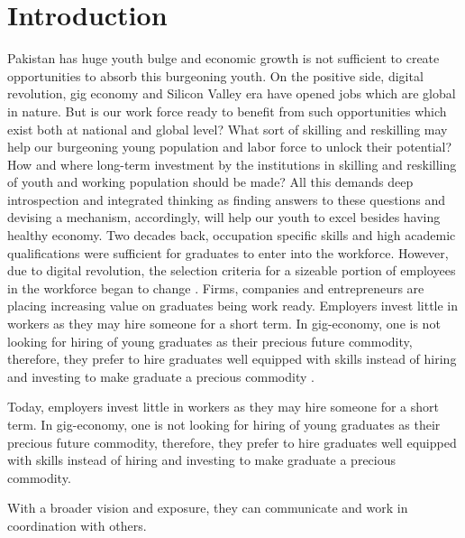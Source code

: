 \documentclass[
  12pt]{article}
\begin{document}
\newpage
{} %
\ifdefined\Shaded\renewenvironment{Shaded}{\begin{tcolorbox}[sharp corners, borderline west={3pt}{0pt}{shadecolor}, boxrule=0pt, breakable, enhanced, frame hidden, interior hidden]}{\end{tcolorbox}}\fi

\hypertarget{sec-intro}{%
\section{Introduction}\label{sec-intro}}

Pakistan has huge youth bulge and economic growth is not sufficient to
create opportunities to absorb this burgeoning youth. On the positive
side, digital revolution, gig economy and Silicon Valley era have opened
jobs which are global in nature. But is our work force ready to benefit
from such opportunities which exist both at national and global level?
What sort of skilling and reskilling may help our burgeoning young
population and labor force to unlock their potential? How and where
long-term investment by the institutions in skilling and reskilling of
youth and working population should be made? All this demands deep
introspection and integrated thinking as finding answers to these
questions and devising a mechanism, accordingly, will help our youth to
excel besides having healthy economy. Two decades back, occupation
specific skills and high academic qualifications were sufficient for
graduates to enter into the workforce. However, due to digital
revolution, the selection criteria for a sizeable portion of employees
in the workforce began to change \citet{assessme2015} . Firms, companies
and entrepreneurs are placing increasing value on graduates being work
ready. Employers invest little in workers as they may hire someone for a
short term. In gig-economy, one is not looking for hiring of young
graduates as their precious future commodity, therefore, they prefer to
hire graduates well equipped with skills instead of hiring and investing
to make graduate a precious commodity \citet{akdere2018} .

Today, employers invest little in workers as they may hire someone for a
short term. In gig-economy, one is not looking for hiring of young
graduates as their precious future commodity, therefore, they prefer to
hire graduates well equipped with skills instead of hiring and investing
to make graduate a precious commodity.

With a broader vision and exposure, they can communicate and work in
coordination with others.
\end{document}
